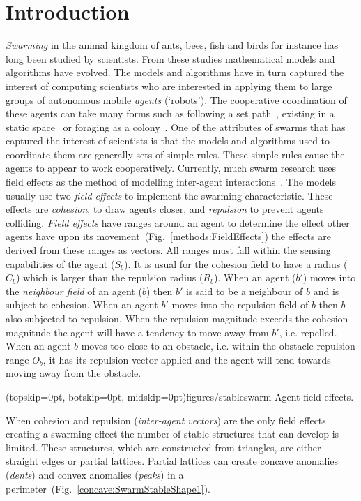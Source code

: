 \documentclass{ieeeaccess}
\begin{document}
\section{Introduction}\label{sec:Introduction}
\textit{Swarming} in the animal kingdom of ants, bees, fish and birds for instance has long been studied by scientists. From these studies mathematical models and algorithms have evolved. The models and algorithms have in turn captured the interest of computing scientists who are interested in applying them to large groups of autonomous mobile \textit{agents} (`robots'). The cooperative coordination of these agents can take many forms such as following a set path~\cite{HCS:09}, existing in a static space~\cite{EP:10, GP:02, GP:04} or foraging as a colony~\cite{HER:11, GK:07}. One of the attributes of swarms that has captured the interest of scientists is that the models and algorithms used to coordinate them are generally sets of simple rules. These simple rules cause the agents to appear to work cooperatively.
Currently, much swarm research uses field effects as the method of modelling inter-agent interactions~\cite{BAF:06, BAFVM:06, BM:09, APZDAMC:09, GP:02, GP:04, GP:04a, GP:05, GP:11, MYP:09}. The models usually use two \textit{field effects} to implement the swarming characteristic. These effects are \textit{cohesion}, to draw agents closer, and \textit{repulsion} to prevent agents colliding. \textit{Field effects} have ranges around an agent to determine the effect other agents have upon its movement~(Fig.~\ref{methods:FieldEffects}) the effects are derived from these ranges as vectors. All ranges must fall within the sensing capabilities of the agent ($S_b$). It is usual for the cohesion field to have a radius ($C_b$) which is larger than the repulsion radius ($R_b$). When an agent ($b'$) moves into the \textit{neighbour field} of an agent ($b$) then $b'$ is said to be a neighbour of $b$ and is subject to cohesion. When an agent $b'$ moves into the repulsion field of $b$ then $b$ also subjected to repulsion. When the repulsion magnitude exceeds the cohesion magnitude the agent will have a tendency to move away from $b'$, i.e. repelled. When an agent $b$ moves too close to an obstacle, i.e. within the obstacle repulsion range $O_b$, it has its repulsion vector applied and the agent will tend towards moving away from the obstacle.

\Figure[t!](topskip=0pt, botskip=0pt, midskip=0pt){figures/stableswarm} {Agent field effects.\label{methods:FieldEffects}}

When cohesion and repulsion (\textit{inter-agent vectors}) are the only field effects creating a swarming effect the number of stable structures that can develop is limited. These structures, which are constructed from triangles, are either straight edges or partial lattices. Partial lattices can create concave anomalies (\textit{dents}) and convex anomalies (\textit{peaks}) in a perimeter~(Fig.~\ref{concave:SwarmStableShape1}). 
\end{document}

